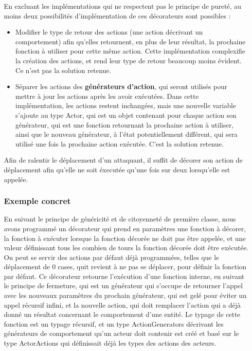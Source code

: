 \documentclass{article}
\begin{document}
En excluant les implémentations qui ne respectent pas le principe de pureté, au moins deux possibilités d'implémentation de ces décorateurs sont possibles :
\begin{itemize}
    \item Modifier le type de retour des actions (une action décrivant un comportement) afin qu'elles retournent, en plus de leur résultat, la prochaine fonction à utiliser pour cette même action. Cette implémentation complexifie la création des actions, et rend leur type de retour beaucoup moins évident. Ce n'est pas la solution retenue.
    \item Séparer les actions des \textbf{générateurs d'action}, qui seront utilisés pour mettre à jour les actions après les avoir exécutées. Dans cette implémentation, les actions restent inchangées, mais une nouvelle variable s'ajoute au type Actor, qui est un objet contenant pour chaque action son générateur, qui est une fonction retournant la prochaine action à utiliser, ainsi que le nouveau générateur, à l'état potentiellement différent, qui sera utilisé une fois la prochaine action exécutée. C'est la solution retenue.
\end{itemize}

Afin de ralentir le déplacement d'un attaquant, il suffit de décorer son action de déplacement afin qu'elle ne soit éxecutée qu'une fois sur deux lorsqu'elle est appelée.

\subsubsection{Exemple concret}

En suivant le principe de généricité et de citoyenneté de première classe, nous avons programmé un décorateur qui prend en paramètres une fonction à décorer, la fonction à exécuter lorsque la fonction décorée ne doit pas être appelée, et une valeur définissant tous les combien de tours la fonction décorée doit être exécutée. On peut se servir des actions par défaut déjà programmées, telles que le déplacement de 0 cases, quit revient à ne pas se déplacer, pour définir la fonction par défaut.
Ce décorateur retourne l'exécution d'une fonction interne, en suivant le principe de fermeture, qui est un générateur qui s'occupe de retourner l'appel avec les nouveaux paramètres du prochain générateur, qui est gelé pour éviter un appel récursif infini, et la nouvelle action, qui doit remplacer l'action qui a déjà donné un résultat concernant le comportement d'une entité. Le typage de cette fonction est un typage récursif, et un type ActionGenerators décrivant les générateurs de comportement qu'un acteur doit contenir est créé et basé sur le type ActorActions qui définissait déjà les types des actions des acteurs.
\end{document}
